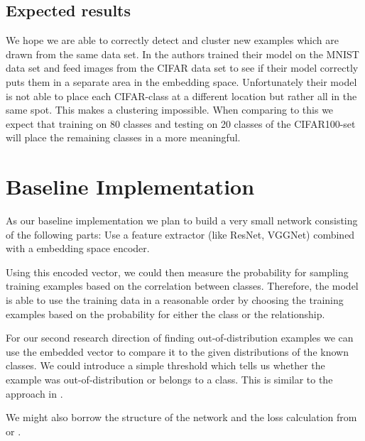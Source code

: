 \subsection{Expected results}
We hope we are able to correctly detect and cluster new examples which are drawn from the same data set. In \cite{yang2018robust} the authors trained their model on the MNIST data set and feed images from the CIFAR data set to see if their model correctly puts them in a separate area in the embedding space. Unfortunately their model is not able to place each CIFAR-class at a different location but rather all in the same spot. This makes a clustering impossible. When comparing to this we expect that training on 80 classes and testing on 20 classes of the CIFAR100-set will place the remaining classes in a more meaningful.

\section{Baseline Implementation}

As our baseline implementation we plan to build a very small network consisting of the following parts: Use a feature extractor (like ResNet, VGGNet) combined with a embedding space encoder. 

Using this encoded vector, we could then measure the probability for sampling training examples based on the correlation between classes. Therefore, the model is able to use the training data in a reasonable order by choosing the training examples based on the probability for either the class or the relationship. 

For our second research direction of finding out-of-distribution examples we can use the embedded vector to compare it to the given distributions of the known classes. We could introduce a simple threshold which tells us whether the example was out-of-distribution or belongs to a class. This is similar to the approach in \cite{yang2018robust}.

We might also borrow the structure of the network and the loss calculation from \cite{edwards2016towards} or \cite{snell2017prototypical}.
